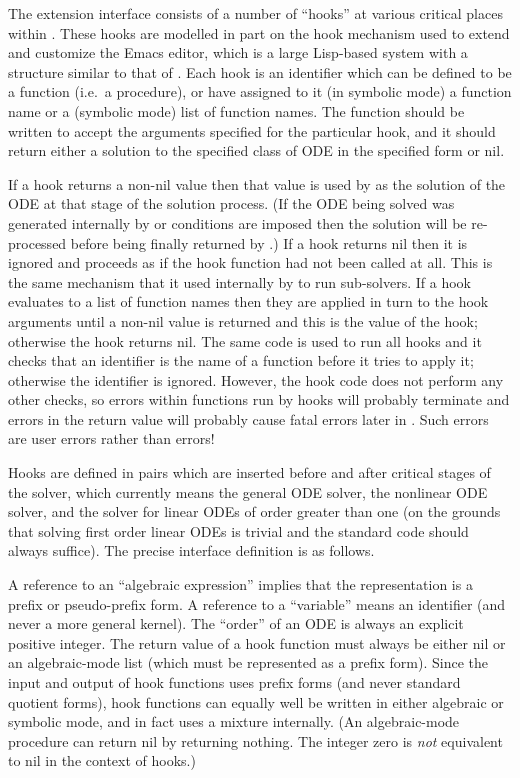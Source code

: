 The extension interface consists of a number of ``hooks'' at various
critical places within .  These hooks are modelled in part on
the hook mechanism used to extend and customize the Emacs editor,
which is a large Lisp-based system with a structure similar to that of
\REDUCE.  Each  hook is an identifier which can be defined to
be a function (i.e.\ a procedure), or have assigned to it (in symbolic
mode) a function name or a (symbolic mode) list of function names.
The function should be written to accept the arguments specified for
the particular hook, and it should return either a solution to the
specified class of ODE in the specified form or nil.

If a hook returns a non-nil value then that value is used by
 as the solution of the ODE at that stage of the solution
process.  (If the ODE being solved was generated internally by
 or conditions are imposed then the solution will be
re-processed before being finally returned by .)  If a
hook returns nil then it is ignored and  proceeds as if
the hook function had not been called at all.  This is the same
mechanism that it used internally by  to run sub-solvers.
If a hook evaluates to a list of function names then they are applied
in turn to the hook arguments until a non-nil value is returned and
this is the value of the hook; otherwise the hook returns nil.  The
same code is used to run all hooks and it checks that an identifier is
the name of a function before it tries to apply it; otherwise the
identifier is ignored.  However, the hook code does not perform any
other checks, so errors within functions run by hooks will probably
terminate  and errors in the return value will probably
cause fatal errors later in .  Such errors are user
errors rather than  errors!

Hooks are defined in pairs which are inserted before and after
critical stages of the solver, which currently means the general ODE
solver, the nonlinear ODE solver, and the solver for linear ODEs of
order greater than one (on the grounds that solving first order linear
ODEs is trivial and the standard  code should always
suffice).  The precise interface definition is as follows.

A reference to an ``algebraic expression'' implies that the \REDUCE{}
representation is a prefix or pseudo-prefix form.  A reference to a
``variable'' means an identifier (and never a more general kernel).
The ``order'' of an ODE is always an explicit positive integer.  The
return value of a hook function must always be either nil or an
algebraic-mode list (which must be represented as a prefix form).
Since the input and output of hook functions uses prefix forms (and
never standard quotient forms), hook functions can equally well be
written in either algebraic or symbolic mode, and in fact 
uses a mixture internally.  (An algebraic-mode procedure can return
nil by returning nothing.  The integer zero is \emph{not} equivalent
to nil in the context of  hooks.)

